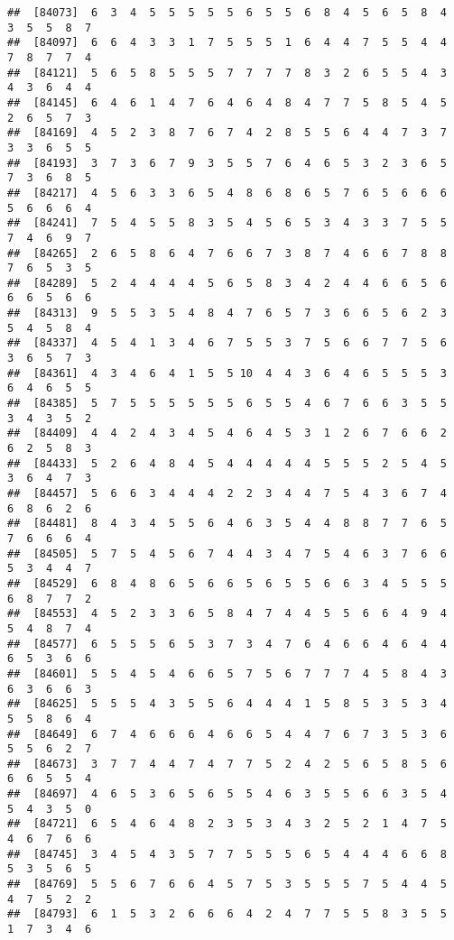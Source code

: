 \documentclass[
]{book}
\begin{document}
\begin{verbatim}
##  [84073]  6  3  4  5  5  5  5  5  6  5  5  6  8  4  5  6  5  8  4  3  5  5  8  7
##  [84097]  6  6  4  3  3  1  7  5  5  5  1  6  4  4  7  5  5  4  4  7  8  7  7  4
##  [84121]  5  6  5  8  5  5  5  7  7  7  7  8  3  2  6  5  5  4  3  4  3  6  4  4
##  [84145]  6  4  6  1  4  7  6  4  6  4  8  4  7  7  5  8  5  4  5  2  6  5  7  3
##  [84169]  4  5  2  3  8  7  6  7  4  2  8  5  5  6  4  4  7  3  7  3  3  6  5  5
##  [84193]  3  7  3  6  7  9  3  5  5  7  6  4  6  5  3  2  3  6  5  7  3  6  8  5
##  [84217]  4  5  6  3  3  6  5  4  8  6  8  6  5  7  6  5  6  6  6  5  6  6  6  4
##  [84241]  7  5  4  5  5  8  3  5  4  5  6  5  3  4  3  3  7  5  5  7  4  6  9  7
##  [84265]  2  6  5  8  6  4  7  6  6  7  3  8  7  4  6  6  7  8  8  7  6  5  3  5
##  [84289]  5  2  4  4  4  4  5  6  5  8  3  4  2  4  4  6  6  5  6  6  6  5  6  6
##  [84313]  9  5  5  3  5  4  8  4  7  6  5  7  3  6  6  5  6  2  3  5  4  5  8  4
##  [84337]  4  5  4  1  3  4  6  7  5  5  3  7  5  6  6  7  7  5  6  3  6  5  7  3
##  [84361]  4  3  4  6  4  1  5  5 10  4  4  3  6  4  6  5  5  5  3  6  4  6  5  5
##  [84385]  5  7  5  5  5  5  5  5  6  5  5  4  6  7  6  6  3  5  5  3  4  3  5  2
##  [84409]  4  4  2  4  3  4  5  4  6  4  5  3  1  2  6  7  6  6  2  6  2  5  8  3
##  [84433]  5  2  6  4  8  4  5  4  4  4  4  4  5  5  5  2  5  4  5  3  6  4  7  3
##  [84457]  5  6  6  3  4  4  4  2  2  3  4  4  7  5  4  3  6  7  4  6  8  6  2  6
##  [84481]  8  4  3  4  5  5  6  4  6  3  5  4  4  8  8  7  7  6  5  7  6  6  6  4
##  [84505]  5  7  5  4  5  6  7  4  4  3  4  7  5  4  6  3  7  6  6  5  3  4  4  7
##  [84529]  6  8  4  8  6  5  6  6  5  6  5  5  6  6  3  4  5  5  5  6  8  7  7  2
##  [84553]  4  5  2  3  3  6  5  8  4  7  4  4  5  5  6  6  4  9  4  5  4  8  7  4
##  [84577]  6  5  5  5  6  5  3  7  3  4  7  6  4  6  6  4  6  4  4  6  5  3  6  6
##  [84601]  5  5  4  5  4  6  6  5  7  5  6  7  7  7  4  5  8  4  3  6  3  6  6  3
##  [84625]  5  5  5  4  3  5  5  6  4  4  4  1  5  8  5  3  5  3  4  5  5  8  6  4
##  [84649]  6  7  4  6  6  6  4  6  6  5  4  4  7  6  7  3  5  3  6  5  5  6  2  7
##  [84673]  3  7  7  4  4  7  4  7  7  5  2  4  2  5  6  5  8  5  6  6  6  5  5  4
##  [84697]  4  6  5  3  6  5  6  5  5  4  6  3  5  5  6  6  3  5  4  5  4  3  5  0
##  [84721]  6  5  4  6  4  8  2  3  5  3  4  3  2  5  2  1  4  7  5  4  6  7  6  6
##  [84745]  3  4  5  4  3  5  7  7  5  5  5  6  5  4  4  4  6  6  8  5  3  5  6  5
##  [84769]  5  5  6  7  6  6  4  5  7  5  3  5  5  5  7  5  4  4  5  4  7  5  2  2
##  [84793]  6  1  5  3  2  6  6  6  4  2  4  7  7  5  5  8  3  5  5  1  7  3  4  6

\end{verbatim}
\end{document}
